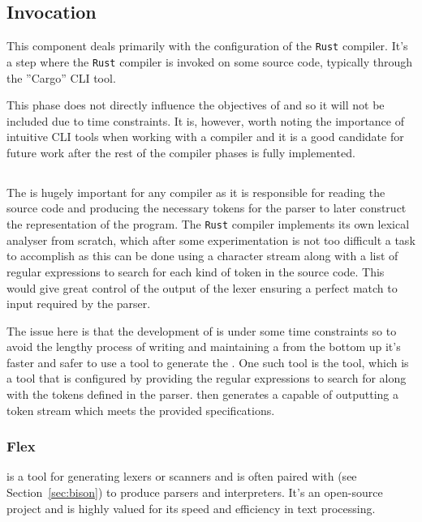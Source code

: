 \subsection{Invocation}

This component deals primarily with the configuration of the \texttt{Rust} compiler. It's a
step where the \texttt{Rust} compiler is invoked on some source code, typically through the
''Cargo'' CLI tool\cite{RUST-COMPILER}. 

This phase does not directly influence the objectives of \lang{} and so it will not
be included due to time constraints. It is, however, worth noting the importance of
intuitive CLI tools when working with a compiler and it is a good candidate for
future work after the rest of the compiler phases is fully implemented.

\subsection{\lexer{}}

The \lexer{} is hugely important for any compiler as it is responsible for
reading the source code and producing the necessary tokens for the parser to later
construct the \ast{} representation of the program. The \texttt{Rust} compiler implements its
own lexical analyser from scratch, which after some experimentation is not too
difficult a task to accomplish as this can be done using a character stream along
with a list of regular expressions to search for each kind of token in the source
code. This would give great control of the output of the lexer ensuring a perfect
match to input required by the parser. 

The issue here is that the development of \lang{} is under some time constraints so
to avoid the lengthy process of writing and maintaining a \lexer{} from the bottom up
it's faster and safer to use a tool to generate the \lexer{}. One such tool is the
\lexerGen{} tool, which is a tool that is configured by providing the regular
expressions to search for along with the tokens defined in the parser. \lexerGen{} then
generates a \lexer{} capable of outputting a token stream which meets the provided
specifications. 

\subsubsection{Flex}

\lexerGen{} is a tool for generating lexers or scanners and is often paired with
\parserGen{} (see Section~\ref{sec:bison}) to produce parsers and interpreters.
It's an open-source project and is highly valued for its speed and efficiency in text
processing. \\

